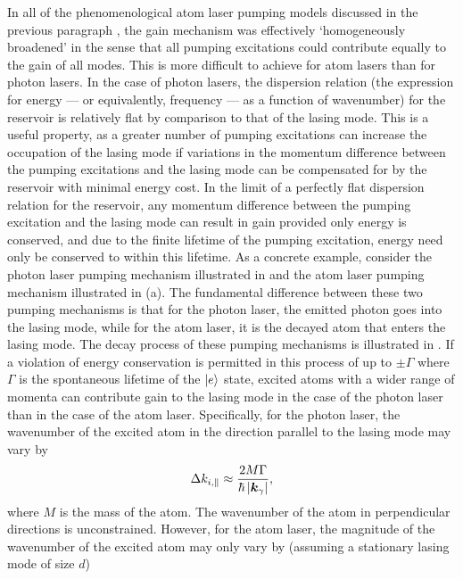 In all of the phenomenological atom laser pumping models discussed in the previous paragraph \citep{Haine:2002kp,Kneer:1998fk,Robins:2001pd}, the gain mechanism was effectively `homogeneously broadened' in the sense that all pumping excitations could contribute equally to the gain of all modes.  This is more difficult to achieve for atom lasers than for photon lasers.  In the case of photon lasers, the dispersion relation (the expression for energy --- or equivalently, frequency --- as a function of wavenumber) for the reservoir is relatively flat by comparison to that of the lasing mode.  This is a useful property, as a greater number of pumping excitations can increase the occupation of the lasing mode if variations in the momentum difference between the pumping excitations and the lasing mode can be compensated for by the reservoir with minimal energy cost.  In the limit of a perfectly flat dispersion relation for the reservoir, any momentum difference between the pumping excitation and the lasing mode can result in gain provided only energy is conserved, and due to the finite lifetime of the pumping excitation, energy need only be conserved to within this lifetime.  As a concrete example, consider the photon laser pumping mechanism illustrated in  and the atom laser pumping mechanism illustrated in (a).  The fundamental difference between these two pumping mechanisms is that for the photon laser, the emitted photon goes into the lasing mode, while for the atom laser, it is the decayed atom that enters the lasing mode.  The decay process of these pumping mechanisms is illustrated in .  If a violation of energy conservation is permitted in this process of up to $\pm \Gamma$ where $\Gamma$ is the spontaneous lifetime of the ${\left|e\right>}$ state, excited atoms with a wider range of momenta can contribute gain to the lasing mode in the case of the photon laser than in the case of the atom laser.  Specifically, for the photon laser, the wavenumber of the excited atom in the direction parallel to the lasing mode may vary by
\begin{align*}
    \Delta k_{i,\parallel} \approx \frac{2 M \Gamma}{\hbar \left|\bm{k}_\gamma\right|},
\end{align*}
where $M$ is the mass of the atom.  The wavenumber of the atom in perpendicular directions is unconstrained.  However, for the atom laser, the magnitude of the wavenumber of the excited atom may only vary by (assuming a stationary lasing mode of size $d$)
